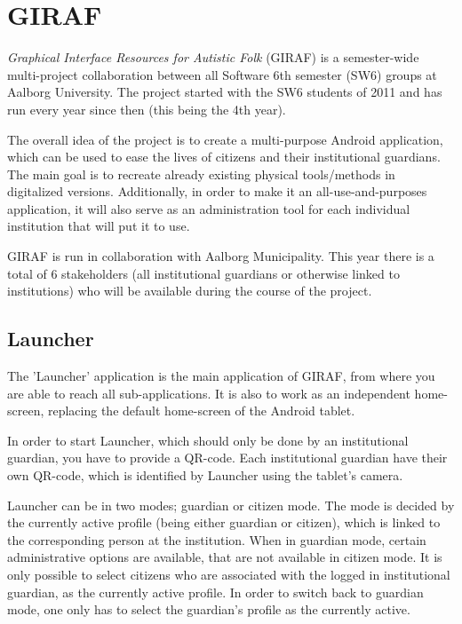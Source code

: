 \section{GIRAF}

\textit{Graphical Interface Resources for Autistic Folk} (GIRAF) is a semester-wide multi-project collaboration between all Software 6th semester (SW6) groups at Aalborg University.
The project started with the SW6 students of 2011 and has run every year since then (this being the 4th year).

The overall idea of the project is to create a multi-purpose Android application, which can be used to ease the lives of citizens and their institutional guardians.
The main goal is to recreate already existing physical tools/methods in digitalized versions.
Additionally, in order to make it an all-use-and-purposes application, it will also serve as an administration tool for each individual institution that will put it to use.

GIRAF is run in collaboration with Aalborg Municipality.
This year there is a total of 6 stakeholders (all institutional guardians or otherwise linked to institutions) who will be available during the course of the project.

\subsection{Launcher}
The 'Launcher' application is the main application of GIRAF, from where you are able to reach all sub-applications.
It is also to work as an independent home-screen, replacing the default home-screen of the Android tablet.

In order to start Launcher, which should only be done by an institutional guardian, you have to provide a QR-code.
Each institutional guardian have their own QR-code, which is identified by Launcher using the tablet's camera.

Launcher can be in two modes; guardian or citizen mode.
The mode is decided by the currently active profile (being either guardian or citizen), which is linked to the corresponding person at the institution.
When in guardian mode, certain administrative options are available, that are not available in citizen mode.
It is only possible to select citizens who are associated with the logged in institutional guardian, as the currently active profile.
In order to switch back to guardian mode, one only has to select the guardian's profile as the currently active.

